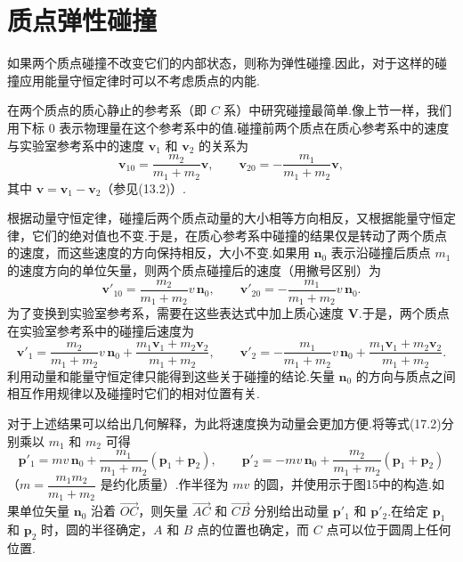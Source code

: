 \section{质点弹性碰撞}

如果两个质点碰撞不改变它们的内部状态，则称为弹性碰撞.因此，对于这样的碰撞应用能量守恒定律时可以不考虑质点的内能.

在两个质点的质心静止的参考系（即 $C$ 系）中研究碰撞最简单.像上节一样，我们用下标 0 表示物理量在这个参考系中的值.碰撞前两个质点在质心参考系中的速度与实验室参考系中的速度 $\boldsymbol{v}_1$ 和 $\boldsymbol{v}_2$ 的关系为
\begin{equation*}
  \boldsymbol{v}_{10}=\frac{m_2}{m_1+m_2}\boldsymbol{v},\qquad
  \boldsymbol{v}_{20}=-\frac{m_1}{m_1+m_2}\boldsymbol{v},
\end{equation*}
其中 $\boldsymbol{v}=\boldsymbol{v}_1-\boldsymbol{v}_2$（参见(13.2)）.

根据动量守恒定律，碰撞后两个质点动量的大小相等方向相反，又根据能量守恒定律，它们的绝对值也不变.于是，在质心参考系中碰撞的结果仅是转动了两个质点的速度，而这些速度的方向保持相反，大小不变.如果用 $\boldsymbol{n}_0$ 表示沿碰撞后质点 $m_1$ 的速度方向的单位矢量，则两个质点碰撞后的速度（用撇号区别）为
\begin{equation}
  \boldsymbol{v}'_{10}=\frac{m_2}{m_1+m_2}v\,\boldsymbol{n}_0,\qquad
  \boldsymbol{v}'_{20}=-\frac{m_1}{m_1+m_2}v\,\boldsymbol{n}_0.
\end{equation}
为了变换到实验室参考系，需要在这些表达式中加上质心速度 $\boldsymbol{V}$.于是，两个质点在实验室参考系中的碰撞后速度为
\begin{equation}
  \boldsymbol{v}'_1=\frac{m_2}{m_1+m_2}v\,\boldsymbol{n}_0
  +\frac{m_1\boldsymbol{v}_1+m_2\boldsymbol{v}_2}{m_1+m_2},\qquad
  \boldsymbol{v}'_2=-\frac{m_1}{m_1+m_2}v\,\boldsymbol{n}_0
  +\frac{m_1\boldsymbol{v}_1+m_2\boldsymbol{v}_2}{m_1+m_2}.
\end{equation}
利用动量和能量守恒定律只能得到这些关于碰撞的结论.矢量 $\boldsymbol{n}_0$ 的方向与质点之间相互作用规律以及碰撞时它们的相对位置有关.

对于上述结果可以给出几何解释，为此将速度换为动量会更加方便.将等式(17.2)分别乘以 $m_1$ 和 $m_2$ 可得
\begin{equation}
  \boldsymbol{p}'_1=mv\,\boldsymbol{n}_0
  +\frac{m_1}{m_1+m_2}\left(\boldsymbol{p}_1+\boldsymbol{p}_2\right),\qquad
  \boldsymbol{p}'_2=-mv\,\boldsymbol{n}_0
  +\frac{m_2}{m_1+m_2}\left(\boldsymbol{p}_1+\boldsymbol{p}_2\right)
\end{equation}
（$m=\dfrac{m_1m_2}{m_1+m_2}$ 是约化质量）.作半径为 $mv$ 的圆，并使用示于图15中的构造.如果单位矢量 $\boldsymbol{n}_0$ 沿着 $\overrightarrow{OC}$，则矢量 $\overrightarrow{AC}$ 和 $\overrightarrow{CB}$ 分别给出动量 $\boldsymbol{p}'_1$ 和 $\boldsymbol{p}'_2$.在给定 $\boldsymbol{p}_1$ 和 $\boldsymbol{p}_2$ 时，圆的半径确定，$A$ 和 $B$ 点的位置也确定，而 $C$ 点可以位于圆周上任何位置.

